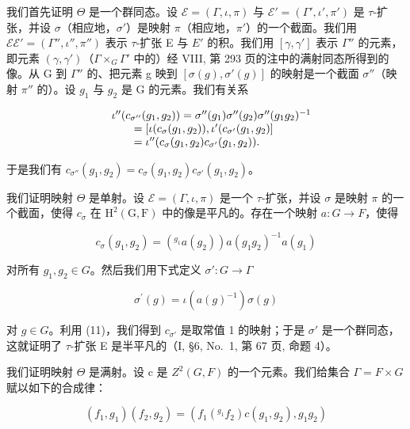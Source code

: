我们首先证明 \(\Theta\) 是一个群同态。设 \(\mathcal{E} = (\Gamma, \iota, \pi)\) 与 \(\mathcal{E}' = (\Gamma', \iota', \pi')\) 是 \(\tau\)-扩张，并设 \(\sigma\)（相应地，\(\sigma'\)）是映射 \(\pi\)（相应地，\(\pi'\)）的一个截面。我们用 \(\mathcal{E}\mathcal{E}' = (\Gamma'', \iota'', \pi'')\) 表示 \(\tau\)-扩张 E 与 \(E'\) 的积。我们用 \([\gamma, \gamma']\) 表示 \(\Gamma''\) 的元素，即元素 \((\gamma, \gamma')\)（\(\Gamma \times_{G} \Gamma'\) 中的）经 VIII, 第 293 页的注中的满射同态所得到的像。从 G 到 \(\Gamma''\) 的、把元素 g 映到 \([\sigma(g), \sigma'(g)]\) 的映射是一个截面 \(\sigma''\)（映射 \(\pi''\) 的）。设 \(g_1\) 与 \(g_2\) 是 G 的元素。我们有关系

\[
\begin{array}{r l} & {\iota^ {\prime \prime} (c _ {\sigma^ {\prime \prime}} (g _ {1}, g _ {2})) = \sigma^ {\prime \prime} (g _ {1}) \sigma^ {\prime \prime} (g _ {2}) \sigma^ {\prime \prime} (g _ {1} g _ {2}) ^ {- 1}} \\ & {\qquad = [ \iota (c _ {\sigma} (g _ {1}, g _ {2})), \iota^ {\prime} (c _ {\sigma^ {\prime}} (g _ {1}, g _ {2}) ]} \\ & {\qquad = \iota^ {\prime \prime} (c _ {\sigma} (g _ {1}, g _ {2}) c _ {\sigma^ {\prime}} (g _ {1}, g _ {2})).} \end{array}
\]

于是我们有 \(c_{\sigma''}(g_1, g_2) = c_\sigma(g_1, g_2)c_{\sigma'}(g_1, g_2)\)。

我们证明映射 \(\Theta\) 是单射。设 \(\mathcal{E} = (\Gamma, \iota, \pi)\) 是一个 \(\tau\)-扩张，并设 \(\sigma\) 是映射 \(\pi\) 的一个截面，使得 \(c_{\sigma}\) 在 \(\mathrm{H}^{2}(\mathrm{G}, \mathrm{F})\) 中的像是平凡的。存在一个映射 \(a : G \to F\)，使得

\[
c _ {\sigma} (g _ {1}, g _ {2}) = (^ {g _ {1}} a (g _ {2})) a (g _ {1} g _ {2}) ^ {- 1} a (g _ {1})
\]

对所有 \(g_{1}, g_{2} \in G\)。然后我们用下式定义 \(\sigma' : G \to \Gamma\)

\[
\sigma^ {\prime} (g) = \iota (a (g) ^ {- 1}) \sigma (g)
\]

对 \(g \in G\)。利用 (11)，我们得到 \(c_{\sigma'}\) 是取常值 1 的映射；于是 \(\sigma'\) 是一个群同态，这就证明了 \(\tau\)-扩张 E 是半平凡的（I, §6, No.~1, 第 67 页, 命题 4）。

我们证明映射 \(\Theta\) 是满射。设 c 是 \(Z^{2}(G,F)\) 的一个元素。我们给集合 \(\Gamma = F \times G\) 赋以如下的合成律：

\[
(f _ {1}, g _ {1}) (f _ {2}, g _ {2}) = \left(f _ {1} (^ {g _ {1}} f _ {2}) c (g _ {1}, g _ {2}), g _ {1} g _ {2}\right)\tag{12}
\]

